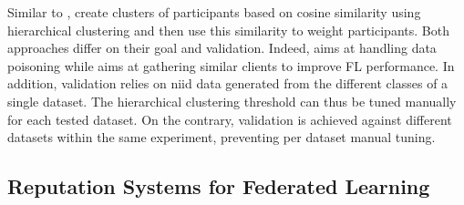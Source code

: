 Similar to \thecontrib, \citet{ye_pfedsa_2023} create clusters of participants based on cosine similarity using hierarchical clustering and then use this similarity to weight participants. 
Both approaches differ on their goal and validation.  
Indeed, \thecontrib aims at handling data poisoning while \citet{ye_pfedsa_2023} aims at gathering similar clients to improve FL performance.
In addition, \citet{ye_pfedsa_2023} validation relies on \gls{niid} data generated from the different classes of a single dataset. 
The hierarchical clustering threshold can thus be tuned manually for each tested dataset. 
On the contrary, \thecontrib validation is achieved against different datasets within the same experiment, preventing per dataset manual tuning. 


\subsection{Reputation Systems for Federated Learning}
\label{sec:bg.trust}

